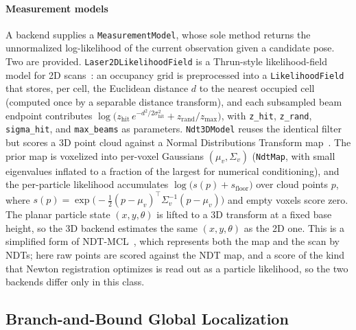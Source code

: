 \paragraph{Measurement models} A backend supplies a \texttt{MeasurementModel},
whose sole method returns the unnormalized log-likelihood of the current
observation given a candidate pose. Two are provided.
\texttt{Laser2DLikelihoodField} is a Thrun-style likelihood-field model for 2D
scans~\cite{thrun2001robust}: an occupancy grid is preprocessed into a
\texttt{LikelihoodField} that stores, per cell, the Euclidean distance $d$ to the
nearest occupied cell (computed once by a separable distance transform), and each
subsampled beam endpoint contributes
$\log\!\big(z_\mathrm{hit}\,e^{-d^2/2\sigma_\mathrm{hit}^2} + z_\mathrm{rand}/z_\mathrm{max}\big)$,
with \texttt{z\_hit}, \texttt{z\_rand}, \texttt{sigma\_hit}, and
\texttt{max\_beams} as parameters. \texttt{Ndt3DModel} reuses the identical
filter but scores a 3D point cloud against a Normal Distributions Transform
map~\cite{biber2003ndt,magnusson2007scan}. The prior map is voxelized into
per-voxel Gaussians $(\mu_v, \Sigma_v)$ (\texttt{NdtMap}, with small eigenvalues
inflated to a fraction of the largest for numerical conditioning), and the
per-particle likelihood accumulates
$\log\!\big(s(p) + s_\mathrm{floor}\big)$ over cloud points $p$, where
$s(p) = \exp\!\big(-\tfrac{1}{2}(p-\mu_v)^\top \Sigma_v^{-1}(p-\mu_v)\big)$ and
empty voxels score zero. The planar particle state $(x,y,\theta)$ is lifted to a
3D transform at a fixed base height, so the 3D backend estimates the same
$(x,y,\theta)$ as the 2D one. This is a simplified form of
NDT-MCL~\cite{saarinen2013ndtmcl}, which represents both the map and the scan by
NDTs; here raw points are scored against the NDT map, and a score of the kind
that Newton registration optimizes is read out as a particle likelihood, so the
two backends differ only in this class.

\subsection{Branch-and-Bound Global Localization}\label{sec:global}

